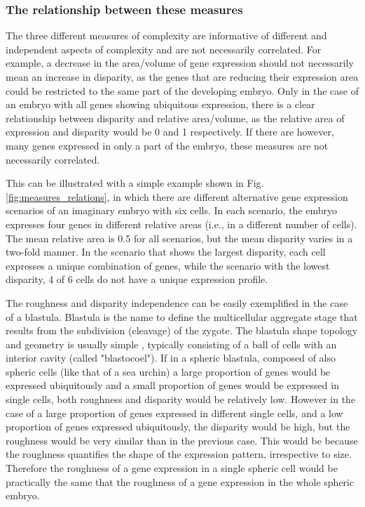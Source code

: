\subsubsection{The relationship between these measures}
\label{measures_relations}

The three different measures of complexity are informative of different and independent aspects of complexity and are not necessarily correlated. 
For example, a decrease in the area/volume of gene expression should not necessarily mean an increase in disparity, as the genes that are reducing their expression area could be restricted to the same part of the developing embryo. 
Only in the case of an embryo with all genes showing ubiquitous expression, there is a clear relationship between disparity and relative area/volume, as the relative area of expression and disparity would be 0 and 1 respectively. If there are however, many genes expressed in only a part of the embryo, these measures are not necessarily correlated. 

This can be illustrated with a simple example shown in Fig. \ref{fig:measures_relations}, in which there are different alternative gene expression scenarios of an imaginary embryo with six cells. In each scenario, the embryo expresses four genes in different relative areas (i.e., in a different number of cells). The mean relative area is 0.5 for all scenarios, but the mean disparity varies in a two-fold manner. In the scenario that shows the largest disparity, each cell expresses a unique combination of genes, while the scenario with the lowest disparity, 4 of 6 cells do not have a unique expression profile.

The roughness and disparity independence can be easily exemplified in the case of a blastula. Blastula is the name to define the multicellular aggregate stage that results from the subdivision (cleavage) of the zygote. The blastula shape topology and geometry is usually simple \citep{Forgacs_Newman2005}, typically consisting of a ball of cells with an interior cavity (called "blastocoel"). If in a spheric blastula, composed of also spheric cells (like that of a sea urchin) a large proportion of genes would be expressed ubiquitously and a small proportion of genes would be expressed in single cells, both roughness and disparity would be relatively low.
However in the case of a large proportion of genes expressed in different single cells, and a low proportion of genes expressed ubiquitously, the disparity would be high, but the roughness would be very similar than in the previous case. This would be because the roughness quantifies the shape of the expression pattern, irrespective to size. Therefore the roughness of a gene expression in a single spheric cell would be practically the same that the roughness of a gene expression in the whole spheric embryo.


